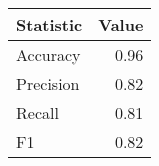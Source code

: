 \begin{table}[ht]
\centering
\begin{tabular}{lr}
  \hline
Statistic & Value \\ 
  \hline
Accuracy & 0.96 \\ 
  Precision & 0.82 \\ 
  Recall & 0.81 \\ 
  F1 & 0.82 \\ 
   \hline
\end{tabular}
\end{table}

